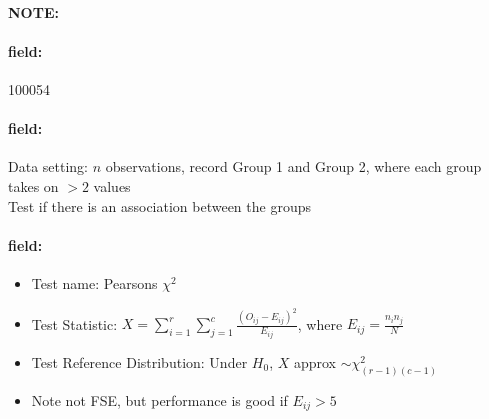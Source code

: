 \documentclass[12pt]{article}
\newenvironment{note}{\paragraph{NOTE:}}{}
\newenvironment{field}{\paragraph{field:}}{}
\begin{document}
\begin{note} \begin{field} \tiny 100054 \end{field}
 \begin{field}
  Data setting: $n$ observations, record Group 1 and Group 2, where each group takes on $> 2$ values\\ Test if there is an association between the groups
 \end{field}
 \begin{field}
  \begin{itemize}
   \item Test name: Pearsons $\chi^2$
   \item Test Statistic: $X = \sum_{i=1}^r \sum_{j=1}^c \frac{(O_{ij} - E_{ij})^2}{E_{ij}}$, where $E_{ij} = \frac{n_in_j}{N}$
   \item Test Reference Distribution: Under $H_0$, $X$ approx $\sim \chi^2_{(r-1)(c-1)}$
   \item Note not FSE, but performance is good if $E_{ij} > 5$
  \end{itemize}
 \end{field}
\end{note}
\end{document}
